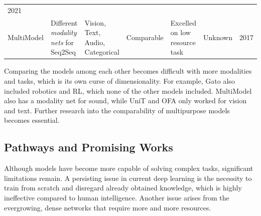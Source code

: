 \documentclass[
]{krantz}
\begin{document}
\begin{longtable}[]{@{}lllllll@{}}
\begin{minipage}[t]{0.12\columnwidth}
2021\strut
\end{minipage}\tabularnewline
\begin{minipage}[t]{0.12\columnwidth}\raggedright
MultiModel\strut
\end{minipage} & \begin{minipage}[t]{0.12\columnwidth}\raggedright
Different \emph{modality nets} for Seq2Seq\strut
\end{minipage} & \begin{minipage}[t]{0.12\columnwidth}\raggedright
Vision, Text, Audio, Categorical\strut
\end{minipage} & \begin{minipage}[t]{0.12\columnwidth}\raggedright
Comparable\strut
\end{minipage} & \begin{minipage}[t]{0.12\columnwidth}\raggedright
Excelled on low resource task\strut
\end{minipage} & \begin{minipage}[t]{0.12\columnwidth}\raggedright
Unknown\strut
\end{minipage} & \begin{minipage}[t]{0.12\columnwidth}\raggedright
2017\strut
\end{minipage}\tabularnewline
\bottomrule
\end{longtable}

Comparing the models among each other becomes difficult with more modalities and tasks, which is its own curse of dimensionality. For example, Gato also included robotics and RL,
which none of the other models included. MultiModel also has a modality net for sound, while UniT and OFA only worked for vision and text. Further research into the comparability of
multipurpose models becomes essential.

\hypertarget{pathways-and-promising-works}{%
\subsection{Pathways and Promising Works}\label{pathways-and-promising-works}}

Although models have become more capable of solving complex tasks, significant limitations remain.
A persisting issue in current deep learning is the necessity to train from scratch and disregard already obtained knowledge, which is highly ineffective compared to human intelligence. Another
issue arises from the evergrowing, dense networks that require more and more resources.
\end{document}
